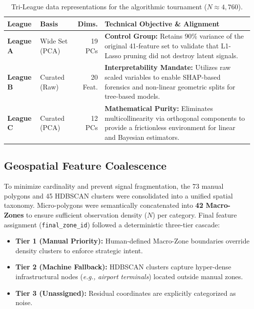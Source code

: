 \begin{table}[H]
    \centering
    \small
    \begin{tabularx}{\textwidth}{l l r X}
        \toprule
        \textbf{League} & \textbf{Basis} & \textbf{Dims.} & \textbf{Technical Objective \& Alignment} \\
        \midrule
        \textbf{League A} & Wide Set (PCA) & 19 PCs & \textbf{Control Group:} Retains 90\% variance of the original 41-feature set to validate that L1-Lasso pruning did not destroy latent signals. \\
        \addlinespace
        \textbf{League B} & Curated (Raw) & 20 Feat. & \textbf{Interpretability Mandate:} Utilizes raw scaled variables to enable SHAP-based forensics and non-linear geometric splits for tree-based models. \\
        \addlinespace
        \textbf{League C} & Curated (PCA) & 12 PCs & \textbf{Mathematical Purity:} Eliminates multicollinearity via orthogonal components to provide a frictionless environment for linear and Bayesian estimators. \\
        \bottomrule
    \end{tabularx}
    \caption{Tri-League data representations for the algorithmic tournament ($N \approx 4,760$).}
    \label{tab:league_alignment}
\end{table}


\subsection{Geospatial Feature Coalescence}
To minimize cardinality and prevent signal fragmentation, the 73 manual polygons and 45 HDBSCAN clusters were consolidated into a unified spatial taxonomy. Micro-polygons were semantically concatenated into \textbf{42 Macro-Zones} to ensure sufficient observation density ($N$) per category. Final feature assignment (\texttt{final\_zone\_id}) followed a deterministic three-tier cascade:

\begin{itemize}[noitemsep, topsep=3pt]
    \item \textbf{Tier 1 (Manual Priority):} Human-defined Macro-Zone boundaries override density clusters to enforce strategic intent.
    \item \textbf{Tier 2 (Machine Fallback):} HDBSCAN clusters capture hyper-dense infrastructural nodes (\textit{e.g., airport terminals}) located outside manual zones.
    \item \textbf{Tier 3 (Unassigned):} Residual coordinates are explicitly categorized as noise.
\end{itemize}

